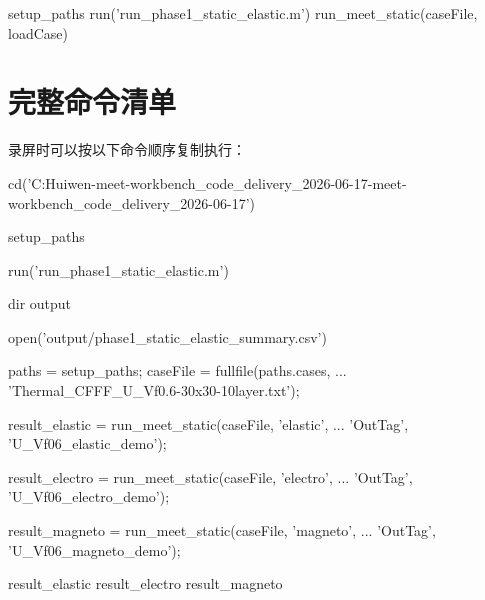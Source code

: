 \documentclass[UTF8,fontset=windows]{ctexart}
\begin{document}
\begin{code}
setup_paths
run('run_phase1_static_elastic.m')
run_meet_static(caseFile, loadCase)
\end{code}

\section{完整命令清单}

录屏时可以按以下命令顺序复制执行：

\begin{code}
cd('C:\Users\You Huiwen\Desktop\fg-meet-workbench_code_delivery_2026-06-17\fg-meet-workbench_code_delivery_2026-06-17')

setup_paths

run('run_phase1_static_elastic.m')

dir output

open('output/phase1_static_elastic_summary.csv')

paths = setup_paths;
caseFile = fullfile(paths.cases, ...
    'Thermal_CFFF_U_Vf0.6-30x30-10layer.txt');

result_elastic = run_meet_static(caseFile, 'elastic', ...
    'OutTag', 'U_Vf06_elastic_demo');

result_electro = run_meet_static(caseFile, 'electro', ...
    'OutTag', 'U_Vf06_electro_demo');

result_magneto = run_meet_static(caseFile, 'magneto', ...
    'OutTag', 'U_Vf06_magneto_demo');

result_elastic
result_electro
result_magneto
\end{code}
\end{document}
